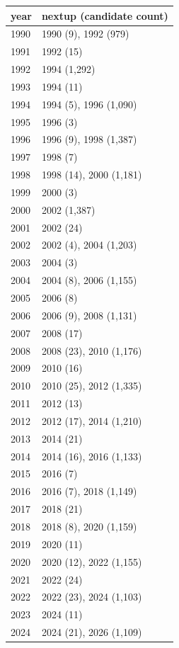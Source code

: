 \footnotesize\begin{tabular}[t]{ll}
\toprule
year & nextup (candidate count)\\
\midrule
1990 & 1990 (9), 1992 (979)\\
1991 & 1992 (15)\\
1992 & 1994 (1,292)\\
1993 & 1994 (11)\\
1994 & 1994 (5), 1996 (1,090)\\
1995 & 1996 (3)\\
1996 & 1996 (9), 1998 (1,387)\\
1997 & 1998 (7)\\
1998 & 1998 (14), 2000 (1,181)\\
1999 & 2000 (3)\\
2000 & 2002 (1,387)\\
2001 & 2002 (24)\\
2002 & 2002 (4), 2004 (1,203)\\
2003 & 2004 (3)\\
2004 & 2004 (8), 2006 (1,155)\\
2005 & 2006 (8)\\
2006 & 2006 (9), 2008 (1,131)\\
2007 & 2008 (17)\\
2008 & 2008 (23), 2010 (1,176)\\
2009 & 2010 (16)\\
2010 & 2010 (25), 2012 (1,335)\\
2011 & 2012 (13)\\
2012 & 2012 (17), 2014 (1,210)\\
2013 & 2014 (21)\\
2014 & 2014 (16), 2016 (1,133)\\
2015 & 2016 (7)\\
2016 & 2016 (7), 2018 (1,149)\\
2017 & 2018 (21)\\
2018 & 2018 (8), 2020 (1,159)\\
2019 & 2020 (11)\\
2020 & 2020 (12), 2022 (1,155)\\
2021 & 2022 (24)\\
2022 & 2022 (23), 2024 (1,103)\\
2023 & 2024 (11)\\
2024 & 2024 (21), 2026 (1,109)\\
\bottomrule
\end{tabular}
